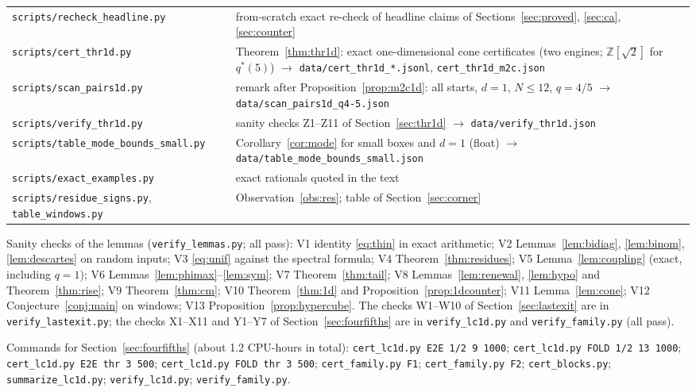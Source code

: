 \documentclass[11pt,a4paper]{article}
\theoremstyle{definition}
\begin{document}
{\begin{tabular}{@{}p{}p{}@{}}
\texttt{scripts/recheck\_headline.py}&from-scratch exact re-check of headline claims of Sections~\ref{sec:proved}, \ref{sec:ca}, \ref{sec:counter}\\
\texttt{scripts/cert\_thr1d.py}&Theorem~\ref{thm:thr1d}: exact one-dimensional cone certificates (two engines; $\mathbb Z[\sqrt2]$ for $q^*(5)$) $\to$ \texttt{data/cert\_thr1d\_*.jsonl}, \texttt{cert\_thr1d\_m2c.json}\\
\texttt{scripts/scan\_pairs1d.py}&remark after Proposition~\ref{prop:m2c1d}: all starts, $d=1$, $N\le12$, $q=4/5$ $\to$ \texttt{data/scan\_pairs1d\_q4-5.json}\\
\texttt{scripts/verify\_thr1d.py}&sanity checks Z1--Z11 of Section~\ref{sec:thr1d} $\to$ \texttt{data/verify\_thr1d.json}\\
\texttt{scripts/table\_mode\_bounds\_small.py}&Corollary~\ref{cor:mode} for small boxes and $d=1$ (float) $\to$ \texttt{data/table\_mode\_bounds\_small.json}\\
\texttt{scripts/exact\_examples.py}&exact rationals quoted in the text\\
\texttt{scripts/residue\_signs.py}, \texttt{table\_windows.py}&Observation~\ref{obs:res}; table of Section~\ref{sec:corner}\\
\bottomrule
\end{tabular}}

\medskip
Sanity checks of the lemmas (\texttt{verify\_lemmas.py}; all pass): V1 identity \eqref{eq:thin} in exact arithmetic; V2 Lemmas~\ref{lem:bidiag}, \ref{lem:binom}, \ref{lem:descartes} on random inputs; V3 \eqref{eq:unif} against the spectral formula; V4 Theorem~\ref{thm:residues}; V5 Lemma~\ref{lem:coupling} (exact, including $q=1$); V6 Lemmas~\ref{lem:phimax}--\ref{lem:sym}; V7 Theorem~\ref{thm:tail}; V8 Lemmas~\ref{lem:renewal}, \ref{lem:hypo} and Theorem~\ref{thm:rise}; V9 Theorem~\ref{thm:cm}; V10 Theorem~\ref{thm:1d} and Proposition~\ref{prop:1dcounter}; V11 Lemma~\ref{lem:cone}; V12 Conjecture~\ref{conj:main} on windows; V13 Proposition~\ref{prop:hypercube}. The checks W1--W10 of Section~\ref{sec:lastexit} are in \texttt{verify\_lastexit.py}; the checks X1--X11 and Y1--Y7 of Section~\ref{sec:fourfifths} are in \texttt{verify\_lc1d.py} and \texttt{verify\_family.py} (all pass).

\medskip
Commands for Section~\ref{sec:fourfifths} (about 1.2 CPU-hours in total): \texttt{cert\_lc1d.py E2E 1/2 9 1000}; \texttt{cert\_lc1d.py FOLD 1/2 13 1000}; \texttt{cert\_lc1d.py E2E thr 3 500}; \texttt{cert\_lc1d.py FOLD thr 3 500}; \texttt{cert\_family.py F1}; \texttt{cert\_family.py F2}; \texttt{cert\_blocks.py}; \texttt{summarize\_lc1d.py}; \texttt{verify\_lc1d.py}; \texttt{verify\_family.py}.
\end{document}

